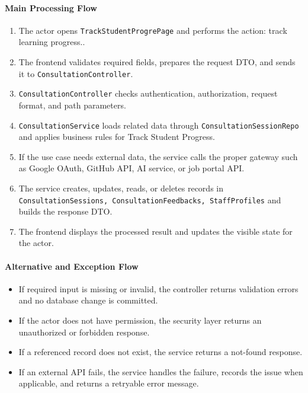 \paragraph{Main Processing Flow}

\begin{enumerate}
    \item The actor opens \texttt{TrackStudentProgrePage} and performs the action: track learning progress..
    \item The frontend validates required fields, prepares the request DTO, and sends it to \texttt{ConsultationController}.
    \item \texttt{ConsultationController} checks authentication, authorization, request format, and path parameters.
    \item \texttt{ConsultationService} loads related data through \texttt{ConsultationSessionRepo} and applies business rules for Track Student Progress.
    \item If the use case needs external data, the service calls the proper gateway such as Google OAuth, GitHub API, AI service, or job portal API.
    \item The service creates, updates, reads, or deletes records in \texttt{ConsultationSessions, ConsultationFeedbacks, StaffProfiles} and builds the response DTO.
    \item The frontend displays the processed result and updates the visible state for the actor.
\end{enumerate}

\paragraph{Alternative and Exception Flow}

\begin{itemize}
    \item If required input is missing or invalid, the controller returns validation errors and no database change is committed.
    \item If the actor does not have permission, the security layer returns an unauthorized or forbidden response.
    \item If a referenced record does not exist, the service returns a not-found response.
    \item If an external API fails, the service handles the failure, records the issue when applicable, and returns a retryable error message.
\end{itemize}

